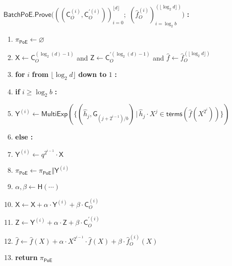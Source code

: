 \documentclass{article}
\theoremstyle{definition}
\begin{document}
\begin{mdframed}
$\mathsf{BatchPoE.Prove}(((\mathsf{C}_O^{(i)}, \mathsf{C}_O^{\prime(i)}))_{i=0}^{\lfloor  d\rfloor};$ $(\hat{f}_O^{(i)})_{i = \log_2 b}^{(\lfloor \log_2 d\rfloor)})$ \textbf{:}
\begin{enumerate}[nolistsep]
	\item $\pi_{\mathsf{PoE}} \gets \varnothing$
	\item $\mathsf{X} \gets \mathsf{C}_O^{(\log_2(d)-1)}$ and $\mathsf{Z} \gets \mathsf{C}_O^{\prime(\log_2(d)-1)}$ and $\hat{f} \gets \hat{f}_O^{(\lfloor \log_2 d \rfloor)}$
	\item \textbf{for} $i$ \textbf{from} $\lfloor \log_2 d \rfloor$ \textbf{down to} $1$ \textbf{:}
	\item \pcind \textbf{if} $i \geq \log_2 b$ \textbf{:} 
	\item \pcind \pcind $\mathsf{Y}^{(i)} \gets \mathsf{MultiExp}(\{(\hat{h}_j, \mathsf{G}_{(j+2^{i-1})/b}) \, | \, \hat{h}_j \cdot X^j \in \mathsf{terms}(\hat{f}(X^{2^i})) \})$ \label{line:batchpoeprove-big}
	\item \pcind \textbf{else :}
	\item \pcind \pcind $\mathsf{Y}^{(i)} \gets q^{2^{i-1}} \cdot \mathsf{X}$ \label{line:batchpoeprove-small}
	\item \pcind $\pi_{\mathsf{PoE}} \gets \pi_{\mathsf{PoE}} \Vert \mathsf{Y}^{(i)}$
	\item \pcind $\alpha, \beta \gets \mathsf{H}(\cdots)$ 
	\item \pcind $\mathsf{X} \gets \mathsf{X} + \alpha \cdot \mathsf{Y}^{(i)} + \beta \cdot \mathsf{C}_O^{(i)}$ \label{line:batchpoeprove-regular}
	\item \pcind $\mathsf{Z} \gets \mathsf{Y}^{(i)} + \alpha \cdot \mathsf{Z} + \beta \cdot \mathsf{C}_O^{\prime(i)}$\label{line:batchpoeprove-prime}
	\item \pcind $\hat{f} \gets \hat{f}(X) + \alpha \cdot X^{2^{i-1}} \cdot \hat{f}(X) + \beta \cdot \hat{f}^{(i)}_O(X)$
	\item \textbf{return} $\pi_{\mathsf{PoE}}$
\end{enumerate}

\end{mdframed}
\end{document}
